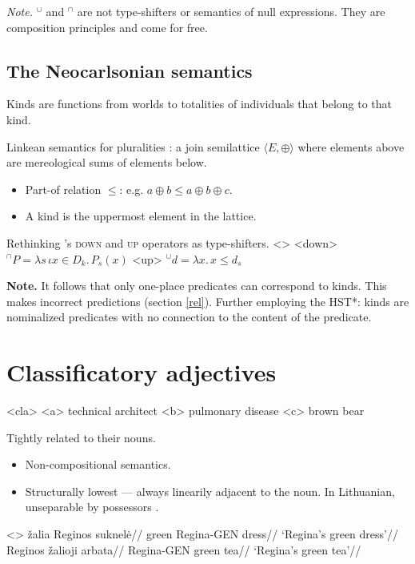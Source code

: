 \documentclass[a4paper,12pt]{article}
\begin{document}
\emph{Note.} $^\cup $ and $^\cap $ are not type-shifters or semantics of null expressions. They are composition principles and come for free.

\subsection{The Neocarlsonian semantics \parencite{chierchia1998referencekindslanguages}}

Kinds are functions from worlds to totalities of individuals that belong to that kind.

Linkean semantics for pluralities \parencite{link1983logicalanalysisplurals}: a join semilattice $\langle E,\oplus\rangle$ where elements above are mereological sums of elements below.
\begin{itemize}
    \item Part-of relation $\le$: e.g. $a\oplus b \le a\oplus b\oplus c$.
    \item A kind is the uppermost element in the lattice.
\end{itemize}

Rethinking \textcite{chierchia1984topicssyntaxsemantics}'s \textsc{down} and \textsc{up} operators as type-shifters.
\pex<>
    \a<down> $^\cap P = \lambda s\,\iota x\in D_k.\,P_s(x)$
    \a<up> $^\cup d = \lambda x.\,x\le d_s$
\xe

\textbf{Note.} It follows that only one-place predicates can correspond to kinds. This makes incorrect predictions (section \ref{rel}). Further employing the HST*: kinds are nominalized predicates with no connection to the content of the predicate.

\section{Classificatory adjectives}

\pex<cla>
    \a<a> technical architect
    \a<b> pulmonary disease
    \a<c> brown bear
\xe

Tightly related to their nouns.

\begin{itemize}
    \item Non-compositional semantics.
    \item Structurally lowest --- always linearily adjacent to the noun. In Lithuanian, unseparable by possessors \parencite{rutkowski2006classifyingadjectivesnoun}.    
\end{itemize}

\pex<>
    \a \begingl
        \gla žalia Reginos suknelė//
        \glb green Regina-GEN dress//
        \glft `Regina’s green dress’//
    \endgl
    \a \begingl
        \gla Reginos žalioji arbata//
        \glb Regina-GEN green tea//
        \glft `Regina’s green tea’//
    \endgl
\xe
\end{document}
